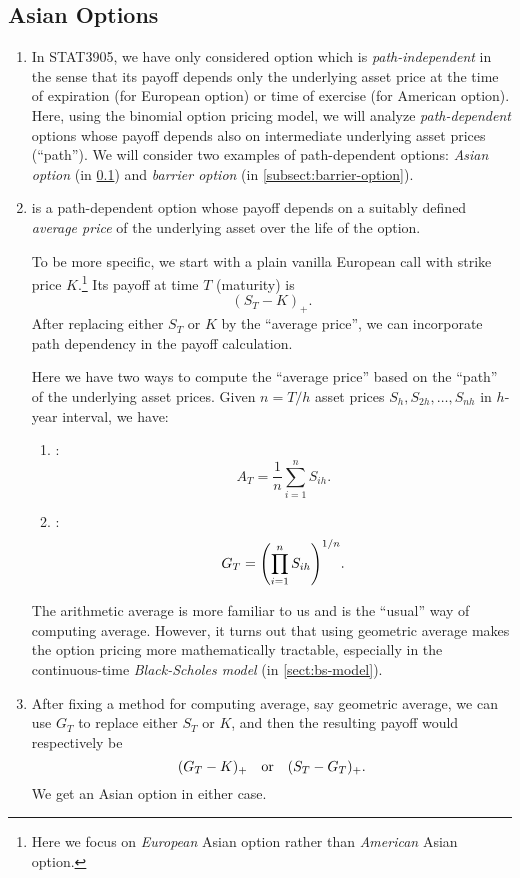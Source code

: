 \subsection{Asian Options}
\label{subsect:asian-option}
\begin{enumerate}
\item In STAT3905, we have only considered option which is
\emph{path-independent} in the sense that its payoff depends only the
underlying asset price at the time of expiration (for European option) or time
of exercise (for American option). Here, using the binomial option pricing
model, we will analyze \emph{path-dependent} options whose payoff depends also
on intermediate underlying asset prices (``path''). We will consider two
examples of path-dependent options: \emph{Asian option} (in
\cref{subsect:asian-option}) and \emph{barrier option} (in
\cref{subsect:barrier-option}).

\item {} is a path-dependent option whose payoff depends on a
suitably defined \emph{average price} of the underlying asset over the life of
the option.

To be more specific, we start with a plain vanilla European call with strike
price \(K\).\footnote{Here we focus on \emph{European} Asian option rather than
\emph{American} Asian option.} Its payoff at time \(T\) (maturity) is
\[
(S_T-K)_{+}.
\]
After replacing either \(S_T\) or \(K\) by the ``average price'', we can
incorporate path dependency in the payoff calculation.

Here we have two ways to compute the ``average price'' based on the ``path''
of the underlying asset prices. Given \(n=T/h\) asset prices
\(S_h,S_{2h},\dotsc,S_{nh}\) in \(h\)-year interval, we have:
\begin{enumerate}
\item {}:
\[
A_T=\frac{1}{n}\sum_{i=1}^{n}S_{ih}.
\]
\item {}:
\[
G_T=\qty(\prod_{i=1}^{n}S_{ih})^{1/n}.
\]
\end{enumerate}
The arithmetic average is more familiar to us and is the ``usual'' way of
computing average. However, it turns out that using geometric average makes the
option pricing more mathematically tractable, especially in the continuous-time
\emph{Black-Scholes model} (in \cref{sect:bs-model}).

\item After fixing a method for computing average, say geometric average, we
can use \(G_T\) to replace either \(S_T\) or \(K\), and then the resulting
payoff would respectively be
\[
(G_T-K)_{+}\qqtext{or}(S_T-G_T)_{+}.
\]
We get an Asian option in either case.


\end{enumerate}
